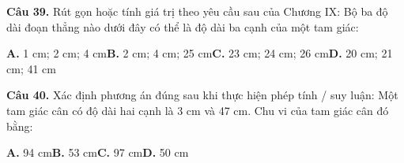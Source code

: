 \documentclass[11pt,a4paper]{article}
\begin{document}
\textbf{\color{primary} Câu 39.} Rút gọn hoặc tính giá trị theo yêu cầu sau của Chương IX: Bộ ba độ dài đoạn thẳng nào dưới đây có thể là độ dài ba cạnh của một tam giác:\par
\hspace*{1.5em}\textbf{A.} 1 cm; 2 cm; 4 cm\quad\quad \textbf{B.} 2 cm; 4 cm; 25 cm\quad\quad \textbf{C.} 23 cm; 24 cm; 26 cm\quad\quad \textbf{D.} 20 cm; 21 cm; 41 cm\par\vspace{2pt}
\textbf{\color{primary} Câu 40.} Xác định phương án đúng sau khi thực hiện phép tính / suy luận: Một tam giác cân có độ dài hai cạnh là 3 cm và 47 cm. Chu vi của tam giác cân đó bằng:\par
\hspace*{1.5em}\textbf{A.} 94 cm\quad\quad \textbf{B.} 53 cm\quad\quad \textbf{C.} 97 cm\quad\quad \textbf{D.} 50 cm\par\vspace{2pt}
\end{document}
